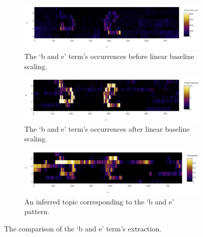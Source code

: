 \documentclass{mpaper}
\begin{document}
\begin{figure}[H]
  \centering

  \begin{subfigure}[b]{0.5\textwidth}
    \caption{The `b and e' term's occurrences before linear baseline scaling.}
    \includegraphics[width=\linewidth]{pre.png}
  \end{subfigure}%

  \begin{subfigure}[b]{0.5\textwidth}
    \caption{The `b and e' term's occurrences after linear baseline scaling.}
    \includegraphics[width=\linewidth]{post.png}
  \end{subfigure}%

  \begin{subfigure}[b]{0.5\textwidth}
    \caption{An inferred topic corresponding to the `b and e' pattern.}
    \includegraphics[width=\linewidth]{topic.png}
  \end{subfigure}%
  \caption{The comparison of the `b and e' term's extraction.}
  \label{fig:comparison}
\end{figure}
\end{document}
